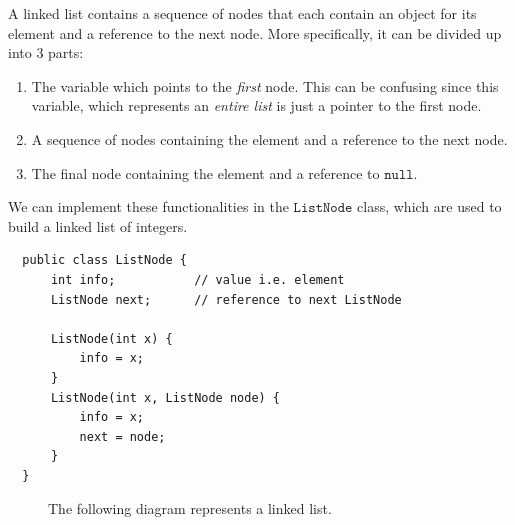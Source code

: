   \begin{definition}
  A linked list contains a sequence of nodes that each contain an object for its element and a reference to the next node. More specifically, it can be divided up into 3 parts: 
  \begin{enumerate}
      \item The variable which points to the \textit{first} node. This can be confusing since this variable, which represents an \textit{entire list} is just a pointer to the first node. 
      \item A sequence of nodes containing the element and a reference to the next node. 
      \item The final node containing the element and a reference to $\texttt{null}$. 
  \end{enumerate}
  We can implement these functionalities in the $\texttt{ListNode}$ class, which are used to build a linked list of integers. 
  \begin{lstlisting}
  public class ListNode {
      int info;           // value i.e. element 
      ListNode next;      // reference to next ListNode
      
      ListNode(int x) {
          info = x; 
      }
      ListNode(int x, ListNode node) {
          info = x; 
          next = node; 
      }
  }
  \end{lstlisting}

  \begin{figure}[H]
    \centering 
    \caption{The following diagram represents a linked list. } 
    \label{fig:linked_list}
  \end{figure}


\end{definition}

